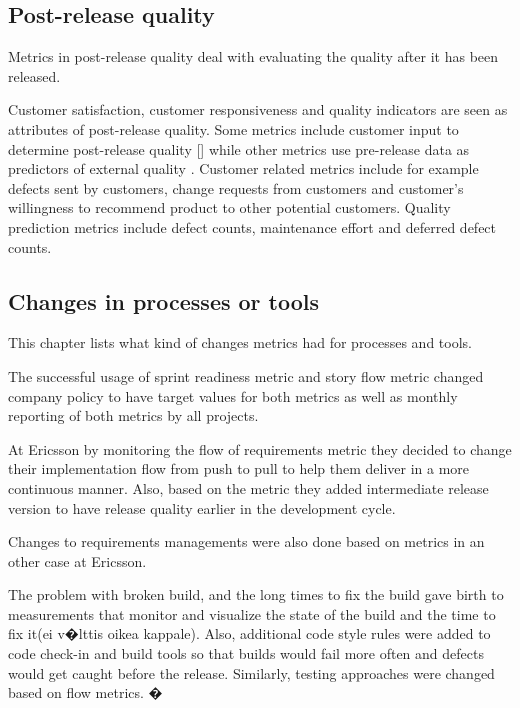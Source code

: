 \documentclass{sig-alternate}
\begin{document}
\subsection{Post-release quality}
\label{PostQuality}
Metrics in post-release quality deal with evaluating the quality after it has
been released.

Customer satisfaction, customer responsiveness and quality indicators are seen
as attributes of post-release quality. Some metrics include customer input to
determine post-release quality\cite{Petersen2010654}
\cite{Green2011}\cite{Cheng200929}[] while other metrics use pre-release data
as predictors of external quality\cite{Staron20101069}
\cite{Petersen2010654}\cite{Green2011}. Customer related metrics include for
example defects sent by customers\cite{Cheng200929}, change requests from
customers\cite{Petersen2010654} and customer's willingness to recommend
product to other potential customers\cite{Green2011}.
Quality prediction metrics include defect counts\cite{Petersen2010654},
maintenance effort\cite{Staron20101069} and deferred defect
counts\cite{Green2011}.

\subsection{Changes in processes or tools}
\label{ChangesInProcesses}
This chapter lists what kind of changes metrics
had for processes and tools.

The successful usage of sprint readiness metric and story flow metric changed
company policy to have target values for both metrics as well as monthly
reporting of both metrics by all projects\cite{Jakobsen2011168}.

At Ericsson by monitoring the flow of requirements metric they decided to
change their implementation flow from push to pull to help them deliver in a
more continuous manner. Also, based on the metric they added intermediate
release version to have release quality earlier in the development
cycle.\cite{Petersen2010654}

Changes to requirements managements were also done based on metrics in
an other case at Ericsson\cite{Mujtaba2010139}. 

The problem with broken build, and the long times to fix the build gave birth
to measurements that monitor and visualize the state of the build and the time
to fix it\cite{LNBIP01490121}\cite{Jakobsen2011168}\cite{Janus20129}(ei
v�lttis oikea kappale).
Also, additional code style rules were added to code check-in and build tools
so that builds would fail more often and defects would get caught before the
release\cite{Jakobsen2011168}\cite{Janus20129}. Similarly, testing approaches
were changed based on flow metrics\cite{Mujtaba2010139}\cite{Staron20101069}.
�
\end{document}
